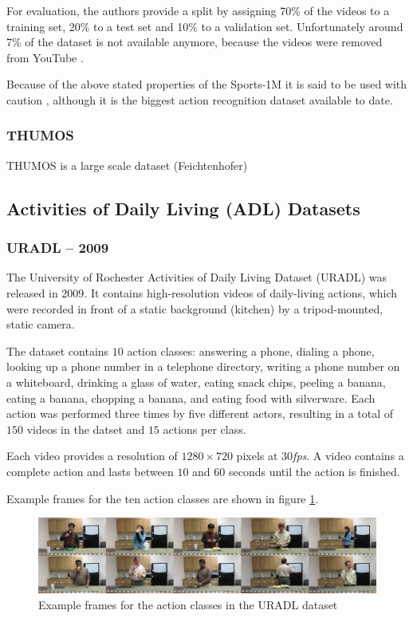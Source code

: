 For evaluation, the authors provide a split by assigning 70\% of the videos to a training set, 20\% to a test set and 10\% to a validation set.
Unfortunately around 7\% of the dataset is not available anymore, because the videos were removed from YouTube \cite{ng_beyond_2015}.

Because of the above stated properties of the Sports-1M it is said to be used with caution \cite{kang_review_2016}, although it is the biggest action recognition dataset available to date.


\subsubsection{THUMOS}
THUMOS is a large scale dataset (Feichtenhofer)


\subsection{Activities of Daily Living (ADL) Datasets}


\subsubsection{URADL -- 2009}
The University of Rochester Activities of Daily Living Dataset (URADL) \cite{messing_activity_2009} was released in 2009.
It contains high-resolution videos of daily-living actions, which were recorded in front of a static background (kitchen) by a tripod-mounted, static camera.

The dataset contains $10$ action classes: answering a phone, dialing a phone, looking up a phone number in a telephone directory, writing a phone number on a whiteboard, drinking a glass of water, eating snack chips, peeling a banana, eating a banana, chopping a banana, and eating food with silverware.
Each action was performed three times by five different actors, resulting in a total of $150$ videos in the datset and $15$ actions per class.

Each video provides a resolution of $1280 \times 720$ pixels at $30$\textit{fps}.
A video contains a complete action and lasts between $10$ and $60$ seconds until the action is finished.

Example frames for the ten action classes are shown in figure \ref{fig:uradl_example}.
\begin{figure}[H]
    \centering
    \includegraphics[width=\textwidth]{img_datasets/uradl_example}
    \caption{Example frames for the action classes in the URADL dataset \cite{_university_????}}
    \label{fig:uradl_example}
\end{figure}


